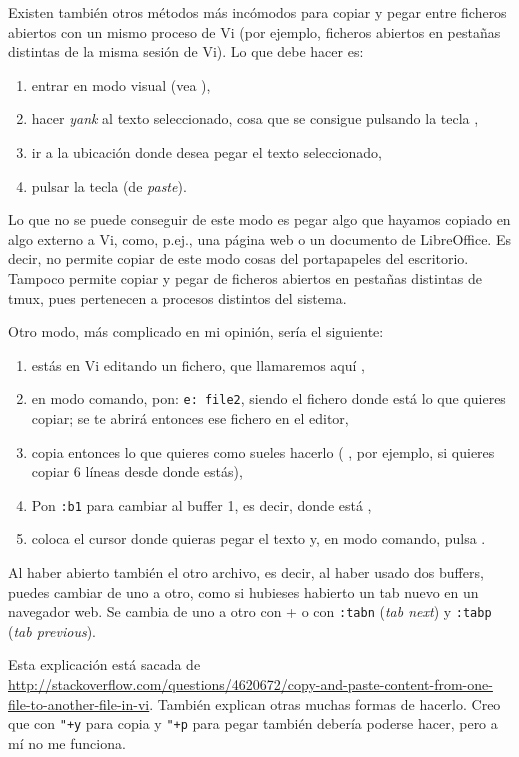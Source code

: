 Existen también otros métodos más incómodos para copiar y pegar entre ficheros abiertos con un mismo proceso
de Vi (por ejemplo, ficheros abiertos en pestañas distintas de la misma sesión de Vi). Lo que debe hacer es:

\begin{enumerate}
  \item entrar en modo visual (vea ),
  \item hacer \foreignlanguage{english}{\emph{yank}} al texto seleccionado, cosa que se consigue pulsando la
    tecla ,
  \item ir a la ubicación donde desea pegar el texto seleccionado,
  \item pulsar la tecla  (de \foreignlanguage{english}{\emph{paste}}).
\end{enumerate}

\noindent Lo que no se puede conseguir de este modo es pegar algo que hayamos copiado en algo externo a Vi,
como, p.ej., una página web o un documento de LibreOffice. Es decir, no permite copiar de este modo cosas del
portapapeles del escritorio. Tampoco permite copiar y pegar de ficheros abiertos en pestañas distintas de tmux,
pues pertenecen a procesos distintos del sistema.

Otro modo, más complicado en mi opinión, sería el siguiente:

\begin{enumerate}
  \item estás en Vi editando un fichero, que llamaremos aquí ,
  \item en modo comando, pon: \lstinline+e: file2+, siendo  el fichero donde está lo que quieres
    copiar; se te abrirá entonces ese fichero en el editor,
  \item copia entonces lo que quieres como sueles hacerlo (  , por ejemplo, si
    quieres copiar 6 líneas desde donde estás),
  \item Pon \lstinline+:b1+ para cambiar al buffer 1, es decir, donde está ,
  \item coloca el cursor donde quieras pegar el texto y, en modo comando, pulsa .
\end{enumerate}

Al haber abierto también el otro archivo, es decir, al haber usado dos buffers, puedes cambiar de uno a otro,
como si hubieses habierto un tab nuevo en un navegador web. Se cambia de uno a otro con  + 
 o con \lstinline+:tabn+ (\foreignlanguage{english}{\emph{tab next}}) y \lstinline+:tabp+
(\foreignlanguage{english}{\emph{tab previous}}).

Esta explicación está sacada de
\url{http://stackoverflow.com/questions/4620672/copy-and-paste-content-from-one-file-to-another-file-in-vi}.
También explican otras muchas formas de hacerlo. Creo que con \lstinline-"+y- para copia y \lstinline-"+p- para
pegar también debería poderse hacer, pero a mí no me funciona.
